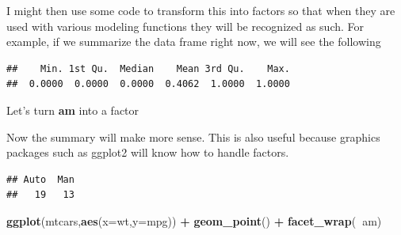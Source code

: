 \documentclass[]{book}
\newenvironment{Shaded}{\begin{snugshade}}{\end{snugshade}}
\newcommand{\KeywordTok}[1]{\textcolor[rgb]{0.13,0.29,0.53}{\textbf{#1}}}
\newcommand{\DataTypeTok}[1]{\textcolor[rgb]{0.13,0.29,0.53}{#1}}
\newcommand{\DecValTok}[1]{\textcolor[rgb]{0.00,0.00,0.81}{#1}}
\newcommand{\StringTok}[1]{\textcolor[rgb]{0.31,0.60,0.02}{#1}}
\newcommand{\OperatorTok}[1]{\textcolor[rgb]{0.81,0.36,0.00}{\textbf{#1}}}
\newcommand{\NormalTok}[1]{#1}
\begin{document}
I might then use some code to transform this into factors so that when
they are used with various modeling functions they will be recognized as
such. For example, if we summarize the data frame right now, we will see
the following

\begin{Shaded}
\end{Shaded}

\begin{verbatim}
##    Min. 1st Qu.  Median    Mean 3rd Qu.    Max. 
##  0.0000  0.0000  0.0000  0.4062  1.0000  1.0000
\end{verbatim}

Let's turn \textbf{am} into a factor

\begin{Shaded}
\end{Shaded}

Now the summary will make more sense. This is also useful because
graphics packages such as ggplot2 will know how to handle factors.

\begin{Shaded}
\end{Shaded}

\begin{verbatim}
## Auto  Man 
##   19   13
\end{verbatim}

\begin{Shaded}
\begin{Highlighting}[]
\KeywordTok{ggplot}\NormalTok{(mtcars,}\KeywordTok{aes}\NormalTok{(}\DataTypeTok{x=}\NormalTok{wt,}\DataTypeTok{y=}\NormalTok{mpg)) }\OperatorTok{+}\StringTok{ }
\StringTok{  }\KeywordTok{geom_point}\NormalTok{() }\OperatorTok{+}\StringTok{ }
\StringTok{  }\KeywordTok{facet_wrap}\NormalTok{(}\OperatorTok{~}\NormalTok{am)}
\end{Highlighting}
\end{Shaded}
\end{document}

